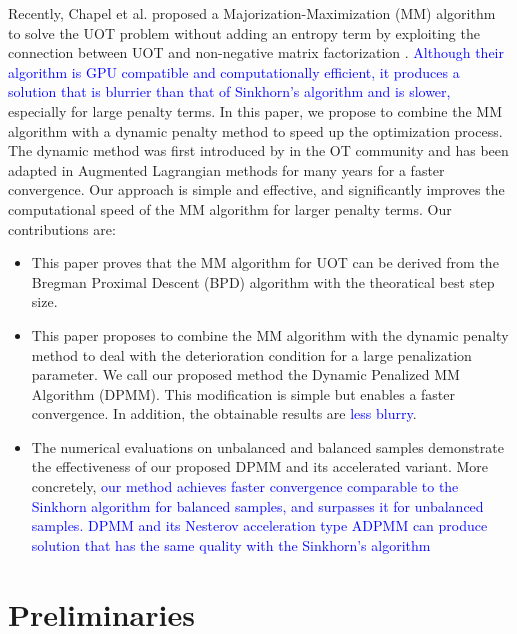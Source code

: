 \documentclass[conference]{IEEEtran}
\newcommand{\changeSX}[1]{\textcolor{blue}{#1}}
\begin{document}
Recently, Chapel et al. proposed a Majorization-Maximization (MM) algorithm to solve the UOT problem without adding an entropy term by exploiting the connection between UOT and non-negative matrix factorization \cite{Chapel_NeurIPS_2021}. \changeSX{Although their algorithm is GPU compatible and computationally efficient, it produces a solution that is blurrier than that of Sinkhorn's algorithm and is slower,} especially for large penalty terms. In this paper, we propose to combine the MM algorithm with a dynamic penalty method to speed up the optimization process. The dynamic method was first introduced by \cite{pmlr-v115-xie20b} in the OT community and has been adapted in Augmented Lagrangian methods for many years for a faster convergence. Our approach is simple and effective, and significantly improves the computational speed of the MM algorithm for larger penalty terms.
Our contributions are:
\begin{itemize}
\item This paper proves that the MM algorithm for UOT can be derived from the Bregman Proximal Descent (BPD) algorithm with the theoratical best step size.
\item This paper proposes to combine the MM algorithm with the dynamic penalty method to deal with the deterioration condition for a large penalization parameter. We call our proposed method the Dynamic Penalized MM Algorithm (DPMM). This modification is simple but enables a faster convergence. In addition, the obtainable results are \changeSX{less blurry}. 
\item The numerical evaluations on unbalanced and balanced samples demonstrate the effectiveness of our proposed DPMM and its accelerated variant. More concretely, \changeSX{our method achieves faster convergence comparable to the Sinkhorn algorithm for balanced samples, and surpasses it for unbalanced samples. DPMM and its Nesterov acceleration type ADPMM can produce solution that has the same quality with the Sinkhorn's algorithm}
\end{itemize}

\section{Preliminaries}
\end{document}
